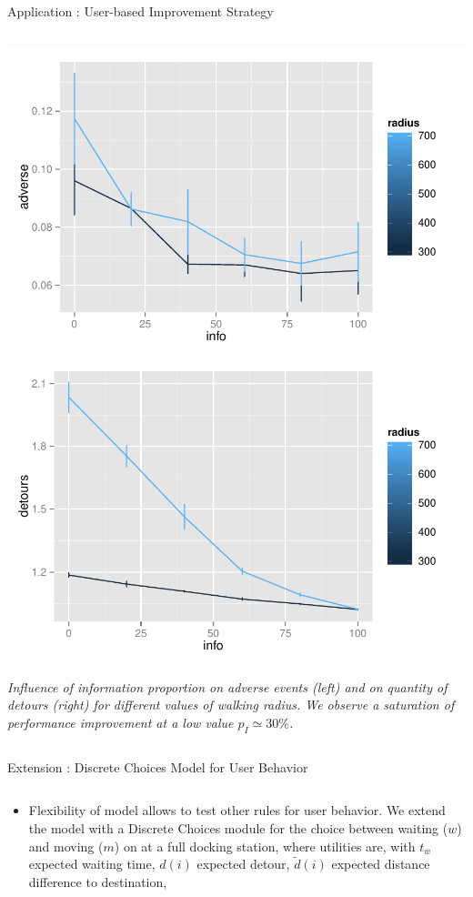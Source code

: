 \documentclass{beamer}
\begin{document}
\begin{frame}{}
\begin{columns}[t]
\begin{column}{.49\textwidth}
\begin{block}{Application : User-based Improvement Strategy}
\begin{columns}[t]
\begin{column}{.95\textwidth}
\begin{justify}
          \bigskip
 
\hfill
\includegraphics[width=0.45\columnwidth]{figures/adverse}
\includegraphics[width=0.45\columnwidth]{figures/detours}
     \hfill
\hfill

\textit{\small Influence of information proportion on adverse events (left) and on quantity of detours (right) for different values of walking radius. We observe a saturation of performance improvement at a low value $p_I\simeq 30\%$.}

\bigskip



          
          
          \end{justify}
          \end{column}
          \end{columns}
        \end{block}




        \begin{block}{Extension : Discrete Choices Model for User Behavior}
        \vspace{-2cm}
          \begin{columns}[t]
        \begin{column}{.95\textwidth}
        
        \begin{itemize}
       \item  \begin{justify}Flexibility of model allows to test other rules for user behavior. We extend the model with a Discrete Choices module for the choice between waiting ($w$) and moving ($m$) on at a full docking station, where utilities are, with $t_w$ expected waiting time, $d(i)$ expected detour, $\tilde{d}(i)$ expected distance difference to destination, \end{justify}
        

\end{itemize}
\end{column}
\end{columns}
\end{block}
\end{column}
\end{columns}
\end{frame}
\end{document}
